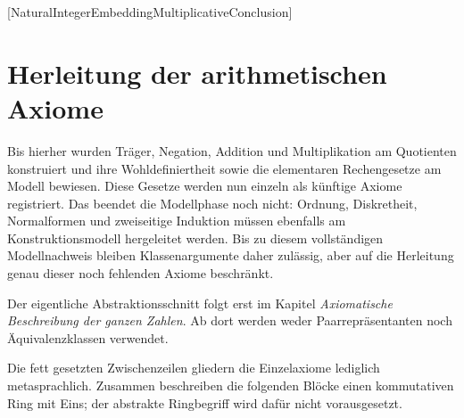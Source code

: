 \begin{tabproofsplitwide}
  \hypertarget{integers.statement.NaturalIntegerEmbeddingMultiplicativeConclusion}{}
[NaturalIntegerEmbeddingMultiplicativeConclusion]
  \closeproofpartwideindR
\end{tabproofsplitwide}

\section{Herleitung der arithmetischen Axiome}

Bis hierher wurden Träger, Negation, Addition und Multiplikation am
Quotienten konstruiert und ihre Wohldefiniertheit sowie die elementaren
Rechengesetze am Modell bewiesen. Diese Gesetze werden nun einzeln als
künftige Axiome registriert. Das beendet die Modellphase noch nicht: Ordnung,
Diskretheit, Normalformen und zweiseitige Induktion müssen ebenfalls am
Konstruktionsmodell hergeleitet werden. Bis zu diesem vollständigen
Modellnachweis bleiben Klassenargumente daher zulässig, aber auf die
Herleitung genau dieser noch fehlenden Axiome beschränkt.

Der eigentliche Abstraktionsschnitt folgt erst im Kapitel
\emph{Axiomatische Beschreibung der ganzen Zahlen}. Ab dort werden weder
Paarrepräsentanten noch Äquivalenzklassen verwendet.

Die fett gesetzten Zwischenzeilen gliedern die Einzelaxiome lediglich
metasprachlich. Zusammen beschreiben die folgenden Blöcke einen kommutativen
Ring mit Eins; der abstrakte Ringbegriff wird dafür nicht vorausgesetzt.


